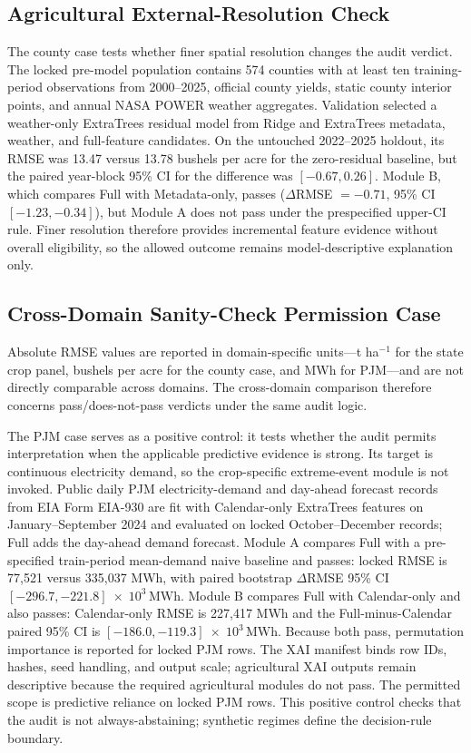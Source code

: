 \documentclass[conference]{IEEEtran}
\begin{document}
\subsection{Agricultural External-Resolution Check}
The county case tests whether finer spatial resolution changes the audit verdict.
The locked pre-model population contains 574 counties with at least ten
training-period observations from 2000--2025, official county yields, static
county interior points, and annual NASA POWER weather aggregates. Validation
selected a weather-only ExtraTrees residual model from Ridge and ExtraTrees
metadata, weather, and full-feature candidates. On the untouched 2022--2025
holdout, its RMSE was 13.47 versus 13.78 bushels per acre for the zero-residual
baseline, but the paired year-block 95\% CI for the difference was
$[-0.67,0.26]$. Module B, which compares Full with Metadata-only, passes
($\Delta$RMSE $=-0.71$, 95\% CI $[-1.23,-0.34]$), but Module A does not pass
under the prespecified upper-CI rule. Finer resolution therefore provides
incremental feature evidence without overall eligibility, so the allowed outcome
remains model-descriptive explanation only.

\subsection{Cross-Domain Sanity-Check Permission Case}
Absolute RMSE values are reported in domain-specific units---t ha$^{-1}$ for the
state crop panel, bushels per acre for the county case, and MWh for PJM---and are
not directly comparable across domains. The cross-domain comparison therefore
concerns pass/does-not-pass verdicts under the same audit logic.

The PJM case serves as a positive control: it tests whether the audit permits
interpretation when the applicable predictive evidence is strong. Its target is
continuous electricity demand, so the crop-specific extreme-event module is not
invoked. Public daily PJM electricity-demand and day-ahead forecast records from
EIA Form EIA-930
\cite{EIA930} are fit with Calendar-only ExtraTrees features on
January--September 2024 and evaluated on locked October--December records; Full
adds the day-ahead demand forecast. Module A compares Full with a pre-specified
train-period mean-demand naive baseline and passes: locked RMSE is 77,521 versus
335,037 MWh, with paired bootstrap $\Delta$RMSE 95\% CI
$[-296.7, -221.8]\;\times\;10^3\,\mathrm{MWh}$. Module B compares Full with Calendar-only and
also passes: Calendar-only RMSE is 227,417 MWh and the Full-minus-Calendar paired
95\% CI is $[-186.0, -119.3]\;\times\;10^3\,\mathrm{MWh}$. Because both pass, permutation
importance is reported for locked PJM rows. The XAI manifest binds row IDs,
hashes, seed handling, and output scale; agricultural XAI outputs remain
descriptive because the required agricultural modules do not pass. The permitted
scope is predictive reliance on locked PJM rows. This positive control checks
that the audit is not always-abstaining; synthetic regimes define the
decision-rule boundary.
\end{document}
